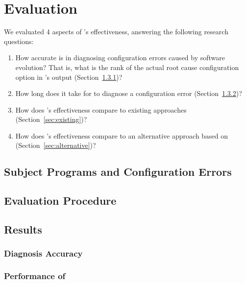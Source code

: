 
\section{Evaluation}
\label{sec:evaluation}

We evaluated 4 aspects of \ourtool's effectiveness, answering
the following research questions:

\begin{enumerate}
\item How accurate is \ourtool in diagnosing configuration errors
caused by software evolution? That is, what is the rank of the
actual root cause configuration option in \ourtool's output (Section~\ref{sec:accuracy})?

\item How long does it take for \ourtool to diagnose
a configuration error (Section~\ref{sec:timecost})?

\item How does \ourtool's effectiveness compare to
existing approaches (Section~\ref{sec:existing})?

\item How does \ourtool's effectiveness compare to
an alternative approach based on  (Section~\ref{sec:alternative})?

\end{enumerate}

\subsection{Subject Programs and Configuration Errors}


\subsection{Evaluation Procedure}

\subsection{Results}

\subsubsection{Diagnosis Accuracy}
\label{sec:accuracy}

\subsubsection{Performance of \ourtool}
\label{sec:timecost}

